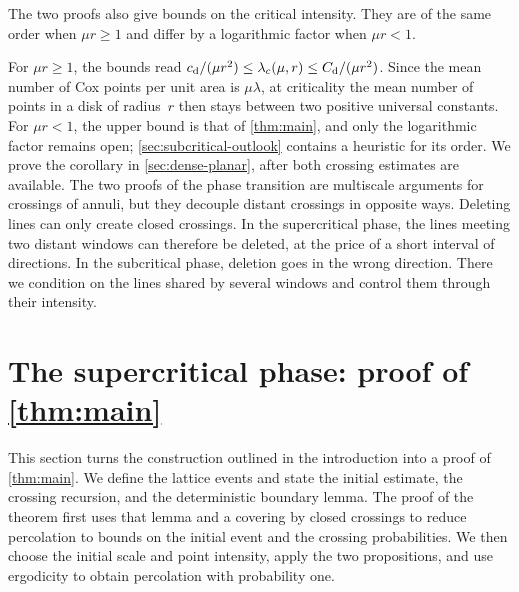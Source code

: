 \documentclass[11pt,letterpaper]{article}
\begin{document}
The two proofs also give bounds on the critical intensity. They are of the same order when $\mu r\ge1$ and differ by a logarithmic factor when $\mu r<1$.

For $\mu r\ge1$, the bounds read $c_{\rm d}/(\mu r^2)\le\lambda_c(\mu,r)\le C_{\rm d}/(\mu r^2)$. Since the mean number of Cox points per unit area is $\mu\lambda$, at criticality the mean number of points in a disk of radius~$r$ then stays between two positive universal constants. For $\mu r<1$, the upper bound is that of \cref{thm:main}, and only the logarithmic factor remains open; \cref{sec:subcritical-outlook} contains a heuristic for its order. We prove the corollary in \cref{sec:dense-planar}, after both crossing estimates are available. The two proofs of the phase transition are multiscale arguments for crossings of annuli, but they decouple distant crossings in opposite ways. Deleting lines can only create closed crossings. In the supercritical phase, the lines meeting two distant windows can therefore be deleted, at the price of a short interval of directions. In the subcritical phase, deletion goes in the wrong direction. There we condition on the lines shared by several windows and control them through their intensity.

\section{The supercritical phase: proof of \texorpdfstring{\cref{thm:main}}{the first main theorem}}
\label{sec:strategy}

This section turns the construction outlined in the introduction into a proof of \cref{thm:main}. We define the lattice events and state the initial estimate, the crossing recursion, and the deterministic boundary lemma. The proof of the theorem first uses that lemma and a covering by closed crossings to reduce percolation to bounds on the initial event and the crossing probabilities. We then choose the initial scale and point intensity, apply the two propositions, and use ergodicity to obtain percolation with probability one.
\end{document}
